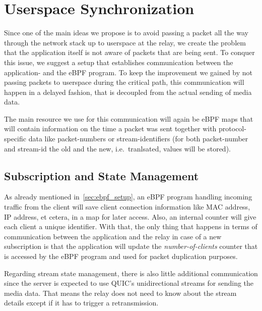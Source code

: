 \section{Userspace Synchronization}\label{sec:userspace_synchronization}

Since one of the main ideas we propose is to avoid passing a packet all the way
through the network stack up to userspace at the relay, we create the 
problem that the application itself is not aware of packets that 
are being sent.
To conquer this issue, we suggest a setup that establishes communication
between the application- and the eBPF program.
To keep the improvement we gained by not passing packets to userspace during the 
critical path, this communication will happen in a delayed fashion, that is 
decoupled from the actual sending of media data.

The main resource we use for this communication will again be eBPF maps that
will contain information on the time a packet was sent together with protocol-specific 
data like packet-numbers or stream-identifiers (for both packet-number 
and stream-id the old and the new, i.e.~tranlsated, values will be stored).



\subsection{Subscription and State Management}
As already mentioned in~\autoref{sec:ebpf_setup}, an eBPF program handling incoming
traffic from the client will save client connection information like MAC address, IP 
address, et cetera, in a map for later access.
Also, an internal counter will give each client a unique identifier. %
With that, the only thing that happens in terms of communication between the application 
and the relay in case of a new subscription is that the application will update the 
\textit{number-of-clients} counter that is accessed by the eBPF program and used for packet duplication purposes.

Regarding stream state management, there is also little additional communication since the 
server is expected to use QUIC's unidirectional streams for sending the media data. 
That means the relay does not need to know about the stream details except if it 
has to trigger a retransmission.

